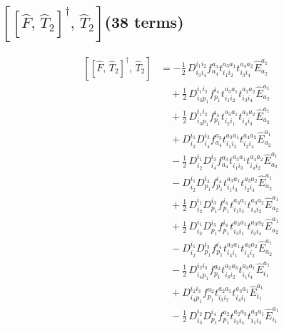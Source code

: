 \documentclass[11pt]{article}
\begin{document}
\subsection*{$\left[\left[\hat{F},\, \hat{T}_{2}\right]^{\dagger},\, \hat{T}_{2}\right]$\quad(38 terms)}
\begin{align}
\left[\left[\hat{F},\, \hat{T}_{2}\right]^{\dagger},\, \hat{T}_{2}\right] &= - \tfrac{1}{2}\, D^{i_{1}i_{2}}_{i_{3}i_{4}} f^{a_{3}}_{a_{4}} t^{a_{3}a_{1}}_{i_{1}i_{2}} t^{a_{4}a_{2}}_{i_{3}i_{4}} \hat{E}^{a_{1}}_{a_{2}} \\
&\quad + \tfrac{1}{2}\, D^{i_{1}i_{2}}_{i_{3}p_{1}} f^{i_{4}}_{p_{1}} t^{a_{3}a_{1}}_{i_{1}i_{2}} t^{a_{3}a_{2}}_{i_{3}i_{4}} \hat{E}^{a_{1}}_{a_{2}} \\
&\quad + \tfrac{1}{2}\, D^{i_{1}i_{2}}_{i_{3}p_{1}} f^{i_{4}}_{p_{1}} t^{a_{3}a_{1}}_{i_{2}i_{1}} t^{a_{3}a_{2}}_{i_{4}i_{3}} \hat{E}^{a_{1}}_{a_{2}} \\
&\quad + D^{i_{1}}_{i_{2}} D^{i_{3}}_{i_{4}} f^{a_{3}}_{a_{4}} t^{a_{3}a_{1}}_{i_{1}i_{3}} t^{a_{4}a_{2}}_{i_{2}i_{4}} \hat{E}^{a_{1}}_{a_{2}} \\
&\quad - \tfrac{1}{2}\, D^{i_{1}}_{i_{2}} D^{i_{3}}_{i_{4}} f^{a_{3}}_{a_{4}} t^{a_{3}a_{1}}_{i_{1}i_{3}} t^{a_{4}a_{2}}_{i_{4}i_{2}} \hat{E}^{a_{1}}_{a_{2}} \\
&\quad - D^{i_{1}}_{i_{2}} D^{i_{3}}_{p_{1}} f^{i_{4}}_{p_{1}} t^{a_{3}a_{1}}_{i_{1}i_{3}} t^{a_{3}a_{2}}_{i_{2}i_{4}} \hat{E}^{a_{1}}_{a_{2}} \\
&\quad + \tfrac{1}{2}\, D^{i_{1}}_{i_{2}} D^{i_{3}}_{p_{1}} f^{i_{4}}_{p_{1}} t^{a_{3}a_{1}}_{i_{1}i_{3}} t^{a_{3}a_{2}}_{i_{4}i_{2}} \hat{E}^{a_{1}}_{a_{2}} \\
&\quad + \tfrac{1}{2}\, D^{i_{1}}_{i_{2}} D^{i_{3}}_{p_{1}} f^{i_{4}}_{p_{1}} t^{a_{3}a_{1}}_{i_{3}i_{1}} t^{a_{3}a_{2}}_{i_{2}i_{4}} \hat{E}^{a_{1}}_{a_{2}} \\
&\quad - D^{i_{1}}_{i_{2}} D^{i_{3}}_{p_{1}} f^{i_{4}}_{p_{1}} t^{a_{3}a_{1}}_{i_{3}i_{1}} t^{a_{3}a_{2}}_{i_{4}i_{2}} \hat{E}^{a_{1}}_{a_{2}} \\
&\quad - \tfrac{1}{2}\, D^{i_{2}i_{3}}_{i_{4}p_{1}} f^{a_{2}}_{p_{1}} t^{a_{2}a_{3}}_{i_{3}i_{2}} t^{a_{3}a_{1}}_{i_{1}i_{4}} \hat{E}^{a_{1}}_{i_{1}} \\
&\quad + D^{i_{2}i_{3}}_{i_{4}p_{1}} f^{a_{2}}_{p_{1}} t^{a_{2}a_{3}}_{i_{3}i_{2}} t^{a_{3}a_{1}}_{i_{4}i_{1}} \hat{E}^{a_{1}}_{i_{1}} \\
&\quad - \tfrac{1}{2}\, D^{i_{2}}_{i_{3}} D^{i_{4}}_{p_{1}} f^{a_{2}}_{p_{1}} t^{a_{2}a_{3}}_{i_{2}i_{4}} t^{a_{3}a_{1}}_{i_{1}i_{3}} \hat{E}^{a_{1}}_{i_{1}} \\

\end{align}
\end{document}
